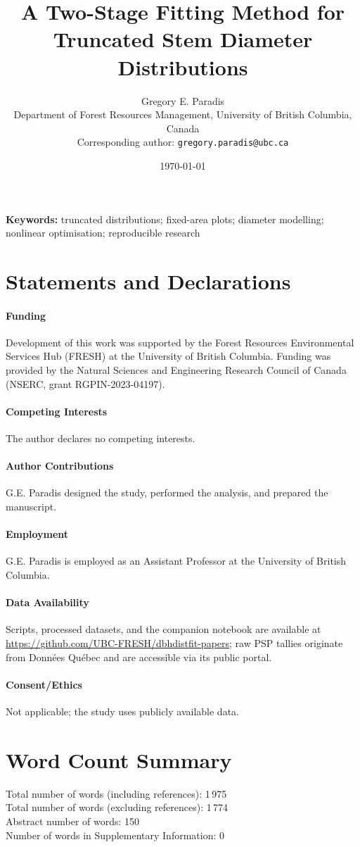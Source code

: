 \documentclass[12pt]{article}
\title{A Two-Stage Fitting Method for Truncated Stem Diameter Distributions}
\author{Gregory E. Paradis\\Department of Forest Resources Management, University of British Columbia, Canada\\Corresponding author: \texttt{gregory.paradis@ubc.ca}}
\date{\today}
\begin{document}
\maketitle

\noindent\textbf{Keywords:} truncated distributions; fixed-area plots; diameter modelling; nonlinear optimisation; reproducible research








\section*{Statements and Declarations}
\paragraph{Funding} Development of this work was supported by the Forest Resources Environmental Services Hub (FRESH) at the University of British Columbia. Funding was provided by the Natural Sciences and Engineering Research Council of Canada (NSERC, grant RGPIN-2023-04197).
\paragraph{Competing Interests} The author declares no competing interests.
\paragraph{Author Contributions} G.E. Paradis designed the study, performed the analysis, and prepared the manuscript.
\paragraph{Employment} G.E. Paradis is employed as an Assistant Professor at the University of British Columbia.
\paragraph{Data Availability} Scripts, processed datasets, and the companion notebook are available at \url{https://github.com/UBC-FRESH/dbhdistfit-papers}; raw PSP tallies originate from Donn\'ees Qu\'ebec and are accessible via its public portal.
\paragraph{Consent/Ethics} Not applicable; the study uses publicly available data.

\appendix


\section*{Word Count Summary}
Total number of words (including references): 1\,975\\
Total number of words (excluding references): 1\,774\\
Abstract number of words: 150\\
Number of words in Supplementary Information: 0



\end{document}
